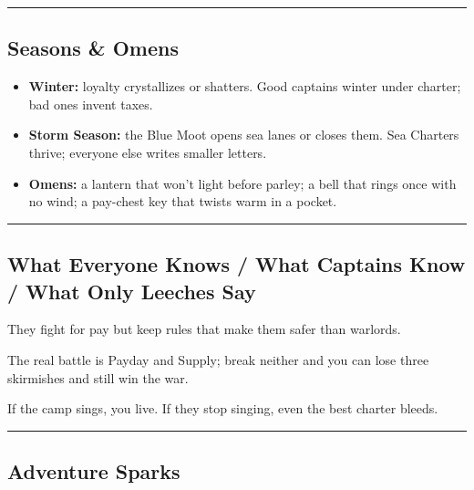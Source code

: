 \documentclass[11pt]{article}
\begin{document}
\rule{\textwidth}{0.4pt}

\subsection*{Seasons \& Omens}

\begin{itemize}
    \item \textbf{Winter:} loyalty crystallizes or shatters. Good captains winter under charter; bad ones invent taxes.
    
    \item \textbf{Storm Season:} the Blue Moot opens sea lanes or closes them. Sea Charters thrive; everyone else writes smaller letters.
    
    \item \textbf{Omens:} a lantern that won't light before parley; a bell that rings once with no wind; a pay-chest key that twists warm in a pocket.
\end{itemize}

\rule{\textwidth}{0.4pt}

\subsection*{What Everyone Knows / What Captains Know / What Only Leeches Say}

\begin{description}[leftmargin=*,labelwidth=4cm]
    \item[Everyone:] They fight for pay but keep rules that make them safer than warlords.
    \item[Captains:] The real battle is Payday and Supply; break neither and you can lose three skirmishes and still win the war.
    \item[Leeches:] If the camp sings, you live. If they stop singing, even the best charter bleeds.
\end{description}

\rule{\textwidth}{0.4pt}

\subsection*{Adventure Sparks}
\end{document}
